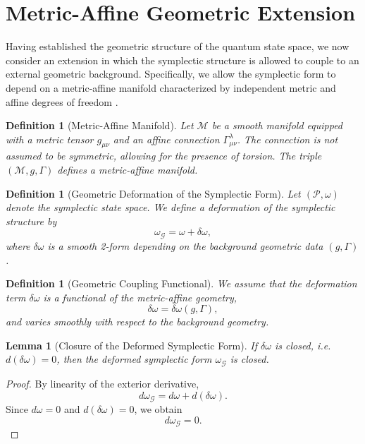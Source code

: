 \documentclass[11pt, a4paper]{article}
\newtheorem{lemma}[theorem]{Lemma}
\newtheorem{definition}[theorem]{Definition}
\begin{document}
\section{Metric-Affine Geometric Extension}

Having established the geometric structure of the quantum state space,
we now consider an extension in which the symplectic structure is allowed
to couple to an external geometric background. Specifically, we allow the
symplectic form to depend on a metric-affine manifold characterized by
independent metric and affine degrees of freedom \cite{hehl1995,shapiro2002}.

\begin{definition}[Metric-Affine Manifold]
Let $\mathcal{M}$ be a smooth manifold equipped with a metric tensor
$g_{\mu\nu}$ and an affine connection $\Gamma^\lambda_{\mu\nu}$.
The connection is not assumed to be symmetric, allowing for the presence
of torsion. The triple $(\mathcal{M}, g, \Gamma)$ defines a
metric-affine manifold.
\end{definition}

\begin{definition}[Geometric Deformation of the Symplectic Form]
Let $(\mathcal{P}, \omega)$ denote the symplectic state space.
We define a deformation of the symplectic structure by
\[
\omega_{\mathcal{G}} = \omega + \delta\omega,
\]
where $\delta\omega$ is a smooth 2-form depending on the background
geometric data $(g, \Gamma)$.
\end{definition}

\begin{definition}[Geometric Coupling Functional]
We assume that the deformation term $\delta\omega$ is a functional of the
metric-affine geometry,
\[
\delta\omega = \delta\omega(g, \Gamma),
\]
and varies smoothly with respect to the background geometry.
\end{definition}

\begin{lemma}[Closure of the Deformed Symplectic Form]
If $\delta\omega$ is closed, i.e. $d(\delta\omega) = 0$, then the deformed
symplectic form $\omega_{\mathcal{G}}$ is closed.
\end{lemma}

\begin{proof}
By linearity of the exterior derivative,
\[
d\omega_{\mathcal{G}} = d\omega + d(\delta\omega).
\]
Since $d\omega = 0$ and $d(\delta\omega) = 0$, we obtain
\[
d\omega_{\mathcal{G}} = 0.
\]
\end{proof}
\end{document}
